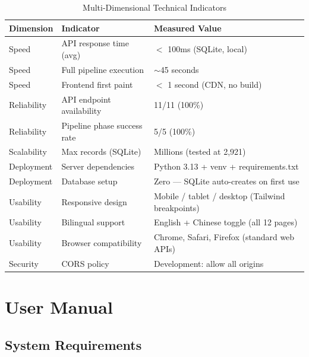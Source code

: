 \documentclass[12pt,a4paper]{report}
\begin{document}
\begin{table}[H]
  \centering
  \caption{Multi-Dimensional Technical Indicators}
  \begin{tabular}{@{}lp{3cm}p{7cm}@{}}
    \toprule
    \textbf{Dimension} & \textbf{Indicator} & \textbf{Measured Value} \\
    \midrule
    Speed        & API response time (avg)       & $<$ 100ms (SQLite, local) \\
    Speed        & Full pipeline execution       & $\sim$45 seconds \\
    Speed        & Frontend first paint          & $<$ 1 second (CDN, no build) \\
    Reliability  & API endpoint availability     & 11/11 (100\%) \\
    Reliability  & Pipeline phase success rate   & 5/5 (100\%) \\
    Scalability  & Max records (SQLite)          & Millions (tested at 2,921) \\
    Deployment   & Server dependencies           & Python 3.13 + venv + requirements.txt \\
    Deployment   & Database setup                & Zero --- SQLite auto-creates on first use \\
    Usability    & Responsive design             & Mobile / tablet / desktop (Tailwind breakpoints) \\
    Usability    & Bilingual support             & English + Chinese toggle (all 12 pages) \\
    Usability    & Browser compatibility          & Chrome, Safari, Firefox (standard web APIs) \\
    Security     & CORS policy                   & Development: allow all origins \\
    \bottomrule
  \end{tabular}
\end{table}

\newpage

\chapter{User Manual}

\section{System Requirements}
\end{document}
